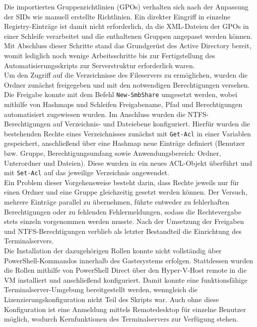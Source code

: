 \documentclass[a4paper,12pt]{article}
\begin{document}
Die importierten Gruppenrichtlinien (GPOs) verhalten sich nach der Anpassung der SIDs wie manuell erstellte Richtlinien. 
Ein direkter Eingriff in einzelne Registry-Einträge ist damit nicht erforderlich, da die XML-Dateien der GPOs in einer Schleife verarbeitet und die enthaltenen Gruppen angepasst werden können. 
Mit Abschluss dieser Schritte stand das Grundgerüst des Active Directory bereit, womit lediglich noch wenige Arbeitsschritte bis zur Fertigstellung des Automatisierungsskripts zur Serverstruktur erforderlich waren.\\

Um den Zugriff auf die Verzeichnisse des Fileservers zu ermöglichen, wurden die Ordner zunächst freigegeben und mit den notwendigen Berechtigungen versehen.
Die Freigabe konnte mit dem Befehl \lstinline|New-SmbShare| umgesetzt werden, wobei mithilfe von Hashmaps und Schleifen Freigabename, Pfad und Berechtigungen automatisiert zugewiesen wurden.
Im Anschluss wurden die NTFS-Berechtigungen auf Verzeichnis- und Dateiebene konfiguriert.
Hierfür wurden die bestehenden Rechte eines Verzeichnisses zunächst mit \lstinline|Get-Acl| in einer Variablen gespeichert, anschließend über eine Hashmap neue Einträge definiert (Benutzer bzw. Gruppe, Berechtigungsumfang sowie Anwendungsbereich: Ordner, Unterordner und Dateien).
Diese wurden in ein neues ACL-Objekt überführt und mit \lstinline|Set-Acl| auf das jeweilige Verzeichnis angewendet.\\

Ein Problem dieser Vorgehensweise besteht darin, dass Rechte jeweils nur für einen Ordner und eine Gruppe gleichzeitig gesetzt werden können. 
Der Versuch, mehrere Einträge parallel zu übernehmen, führte entweder zu fehlerhaften Berechtigungen oder zu fehlenden Fehlermeldungen, sodass die Rechtevergabe stets einzeln vorgenommen werden musste. 
Nach der Umsetzung der Freigaben und NTFS-Berechtigungen verblieb als letzter Bestandteil die Einrichtung des Terminalservers.\\

Die Installation der dazugehörigen Rollen konnte nicht vollständig über PowerShell-Kommandos innerhalb des Gastesystems erfolgen. 
Stattdessen wurden die Rollen mithilfe von PowerShell Direct über den Hyper-V-Host remote in die VM installiert und anschließend konfiguriert. 
Damit konnte eine funktionsfähige Terminalserver-Umgebung bereitgestellt werden, wenngleich die Lizenzierungskonfiguration nicht Teil des Skripts war. 
Auch ohne diese Konfiguration ist eine Anmeldung mittels Remotedesktop für einzelne Benutzer möglich, wodurch Kernfunktionen des Terminalservers zur Verfügung stehen.\\
\end{document}
